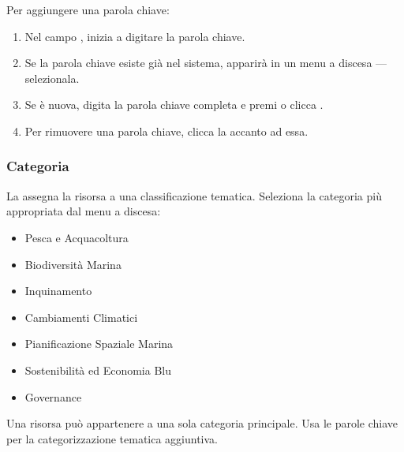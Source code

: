 \documentclass[letterpaper,10pt,english]{sphinxmanual}
\begin{document}
\sphinxAtStartPar
Per aggiungere una parola chiave:
\begin{enumerate}
%
\item {} 
\sphinxAtStartPar
Nel campo , inizia a digitare la parola chiave.

\item {} 
\sphinxAtStartPar
Se la parola chiave esiste già nel sistema, apparirà in un menu a discesa — selezionala.

\item {} 
\sphinxAtStartPar
Se è nuova, digita la parola chiave completa e premi  o clicca .

\item {} 
\sphinxAtStartPar
Per rimuovere una parola chiave, clicca la  accanto ad essa.

\end{enumerate}


\subsubsection{Categoria}
\label{\detokenize{it/03_gestire_metadati:categoria}}
\sphinxAtStartPar
La  assegna la risorsa a una classificazione tematica.
Seleziona la categoria più appropriata dal menu a discesa:
\begin{itemize}
\item {} 
\sphinxAtStartPar
Pesca e Acquacoltura

\item {} 
\sphinxAtStartPar
Biodiversità Marina

\item {} 
\sphinxAtStartPar
Inquinamento

\item {} 
\sphinxAtStartPar
Cambiamenti Climatici

\item {} 
\sphinxAtStartPar
Pianificazione Spaziale Marina

\item {} 
\sphinxAtStartPar
Sostenibilità ed Economia Blu

\item {} 
\sphinxAtStartPar
Governance

\end{itemize}

\sphinxAtStartPar
Una risorsa può appartenere a una sola categoria principale. Usa le parole chiave per
la categorizzazione tematica aggiuntiva.
\end{document}
